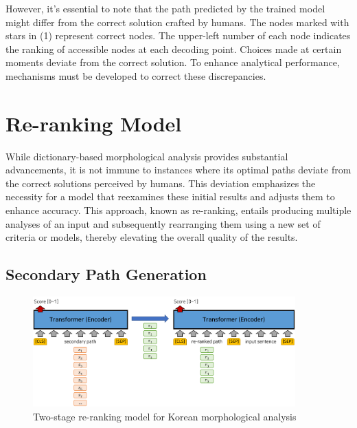 \documentclass[AMS,STIX2COL]{WileyNJD-v2}
\begin{document}
    However, it's essential to note that the path predicted by the trained model might differ from the correct solution crafted by humans.
    The nodes marked with stars in (1) represent correct nodes.
    The upper-left number of each node indicates the ranking of accessible nodes at each decoding point.
    Choices made at certain moments deviate from the correct solution.
    To enhance analytical performance, mechanisms must be developed to correct these discrepancies.


    \section{Re-ranking Model}\label{sec:reranking-model}

    While dictionary-based morphological analysis provides substantial advancements, it is not immune to instances where its optimal paths deviate from the correct solutions perceived by humans.
    This deviation emphasizes the necessity for a model that reexamines these initial results and adjusts them to enhance accuracy.
    This approach, known as re-ranking, entails producing multiple analyses of an input and subsequently rearranging them using a new set of criteria or models, thereby elevating the overall quality of the results.

    \subsection{Secondary Path Generation}\label{subsec:secondary-path-generation}

    \begin{figure}[h]
        \centerline{\includegraphics[width=0.9\textwidth]{fig;ranking-v2}}
        \caption{Two-stage re-ranking model for Korean morphological analysis}
        \label{fig:ranking}
    \end{figure}
\end{document}
